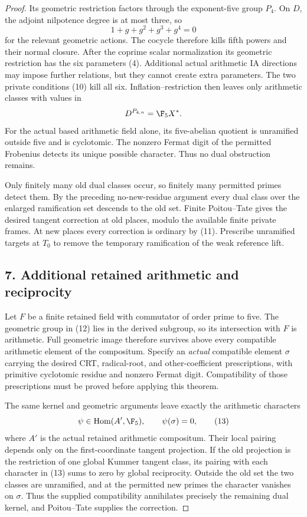 \begin{proof}
Its geometric restriction factors through the exponent-five group $P_4$. On $D$, the adjoint nilpotence degree is at most three, so
\[
 1+g+g^2+g^3+g^4=0
\]
for the relevant geometric actions. The cocycle therefore kills fifth powers and their normal closure. After the coprime scalar normalization its geometric restriction has the six parameters (4). Additional actual arithmetic IA directions may impose further relations, but they cannot create extra parameters. The two private conditions (10) kill all six. Inflation--restriction then leaves only arithmetic classes with values in
\[
 D^{P_{4,n}}=\F_5X^*.
\]
For the actual based arithmetic field alone, its five-abelian quotient is unramified outside five and is cyclotomic. The nonzero Fermat digit of the permitted Frobenius detects its unique possible character. Thus no dual obstruction remains.

Only finitely many old dual classes occur, so finitely many permitted primes detect them. By the preceding no-new-residue argument every dual class over the enlarged ramification set descends to the old set. Finite Poitou--Tate gives the desired tangent correction at old places, modulo the available finite private frames. At new places every correction is ordinary by (11). Prescribe unramified targets at $T_0$ to remove the temporary ramification of the weak reference lift.

\subsection*{7. Additional retained arithmetic and reciprocity}
Let $F$ be a finite retained field with commutator of order prime to five. The geometric group in (12) lies in the derived subgroup, so its intersection with $F$ is arithmetic. Full geometric image therefore survives above every compatible arithmetic element of the compositum. Specify an \emph{actual} compatible element $\sigma$ carrying the desired CRT, radical-root, and other-coefficient prescriptions, with primitive cyclotomic residue and nonzero Fermat digit. Compatibility of those prescriptions must be proved before applying this theorem.

The same kernel and geometric arguments leave exactly the arithmetic characters
\[
 \psi\in\operatorname{Hom}(A',\F_5),\qquad \psi(\sigma)=0,
 \tag{13}
\]
where $A'$ is the actual retained arithmetic compositum. Their local pairing depends only on the first-coordinate tangent projection. If the old projection is the restriction of one global Kummer tangent class, its pairing with each character in (13) sums to zero by global reciprocity. Outside the old set the two classes are unramified, and at the permitted new primes the character vanishes on $\sigma$. Thus the supplied compatibility annihilates precisely the remaining dual kernel, and Poitou--Tate supplies the correction.


\end{proof}
